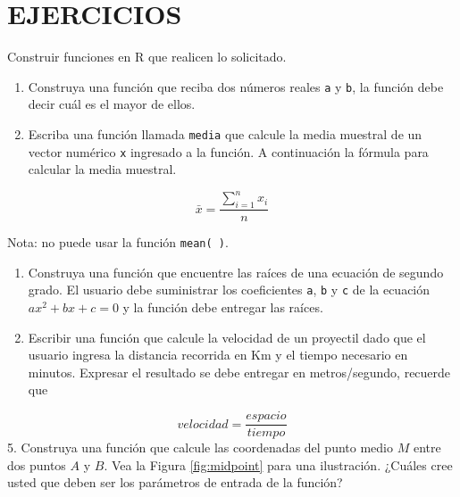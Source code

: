\documentclass[10pt,]{krantz}
\let\proglang=\textsf
\begin{document}
\section*{EJERCICIOS}\label{ejercicios-2}


Construir funciones en \proglang{R} que realicen lo solicitado.

\begin{enumerate}
\def\labelenumi{\arabic{enumi}.}
\item
  Construya una función que reciba dos números reales \texttt{a} y
  \texttt{b}, la función debe decir cuál es el mayor de ellos.
\item
  Escriba una función llamada \texttt{media} que calcule la media
  muestral de un vector numérico \texttt{x} ingresado a la función. A
  continuación la fórmula para calcular la media muestral.
\end{enumerate}

\[\bar{x}=\frac{\sum_{i=1}^n x_i}{n}\]

Nota: no puede usar la función \texttt{mean(\ )}.

\begin{enumerate}
\def\labelenumi{\arabic{enumi}.}
\setcounter{enumi}{2}
\item
  Construya una función que encuentre las raíces de una ecuación de
  segundo grado. El usuario debe suministrar los coeficientes
  \texttt{a}, \texttt{b} y \texttt{c} de la ecuación \(ax^2+bx+c=0\) y
  la función debe entregar las raíces.
\item
  Escribir una función que calcule la velocidad de un proyectil dado que
  el usuario ingresa la distancia recorrida en Km y el tiempo necesario
  en minutos. Expresar el resultado se debe entregar en metros/segundo,
  recuerde que
\end{enumerate}

\[velocidad = \frac{espacio}{tiempo}\] 5. Construya una función que
calcule las coordenadas del punto medio \(M\) entre dos puntos \(A\) y
\(B\). Vea la Figura \ref{fig:midpoint} para una ilustración. ¿Cuáles
cree usted que deben ser los parámetros de entrada de la función?
\end{document}
